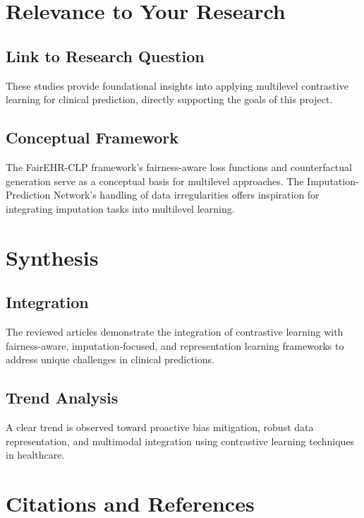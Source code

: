 \documentclass[a4paper]{article}
\begin{document}
    \section{Relevance to Your Research}

    \subsection{Link to Research Question}
    These studies provide foundational insights into applying multilevel contrastive
    learning for clinical prediction, directly supporting the goals of this
    project.

    \subsection{Conceptual Framework}
    The FairEHR-CLP framework's fairness-aware loss functions and counterfactual
    generation serve as a conceptual basis for multilevel approaches. The Imputation-Prediction
    Network’s handling of data irregularities offers inspiration for integrating
    imputation tasks into multilevel learning.

    \section{Synthesis}

    \subsection{Integration}
    The reviewed articles demonstrate the integration of contrastive learning
    with fairness-aware, imputation-focused, and representation learning
    frameworks to address unique challenges in clinical predictions.

    \subsection{Trend Analysis}
    A clear trend is observed toward proactive bias mitigation, robust data representation,
    and multimodal integration using contrastive learning techniques in
    healthcare.

    \section{Citations and References}
\end{document}
